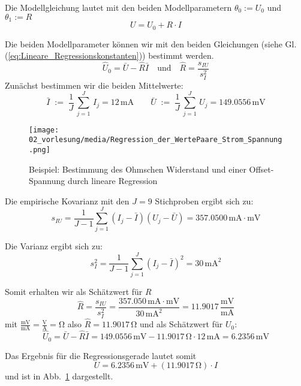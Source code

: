 Die Modellgleichung lautet mit den beiden Modellparametern 
$\theta_0 :=U_0$ und $\theta_1:=R$ 
\begin{equation}
U = U_0 + R \cdot I
\end{equation}

Die beiden Modellparameter können wir mit den beiden Gleichungen (siehe Gl. (\ref{eq:Lineare_Regressionskonstanten})) bestimmt werden.
\begin{equation}
\hat{U}_0 = \bar {U} - \hat{R} \bar {I} \quad \mathrm{und} \quad
\hat{R} = \frac{s_{IU} }{s_I^2 }
\label{eq:Lineare_Regressionskonstanten_Widerstand}
\end{equation}
Zunächst bestimmen wir die beiden Mittelwerte:
\begin{equation}
\bar{I}\; := \; \frac{1}{J} \, \sum\limits_{j = 1}^J \, I_j
= 12 \, \mathrm{mA}
\qquad 
\bar{U} \; := \; \frac{1}{J} \, \sum\limits_{j = 1}^J \, U_j
= 149.0556  \, \mathrm{mV}
\end{equation}
\begin{figure}
	\centering
	\texttt{[image: 02\_vorlesung/media/Regression\_der\_WertePaare\_Strom\_Spannung.png]}
	\caption{Beispiel: Bestimmung des Ohmschen Widerstand und einer Offset-Spannung durch lineare Regression} \label{fig:LineareRegressionWiderstand}
\end{figure}
Die empirische Kovarianz mit den $J = 9$ Stichproben ergibt sich zu: 
\[
s_{IU} = \frac{1}{J - 1}\sum\limits_{j = 1}^J 
(I_j - \bar {I})(U_j - \bar {U}) = 357.0500  \, \mathrm{mA} \cdot \mathrm{mV}
\]

Die Varianz ergibt sich zu: 
\[
s_I^2 = \frac{1}{J - 1}\sum\limits_{j = 1}^J {(I_j - \bar {I})^2} = 30  \, \mathrm{mA}^2
\]

Somit erhalten wir als Schätzwert für $R$
\[
\hat{R} = \frac{s_{IU} }{s_I^2} = \frac{357.050 \, \mathrm{mA} \cdot \mathrm{mV}}{30 \, \mathrm{mA}^2} = 11.9017 
\, \frac{\mathrm{mV}}{\mathrm{mA}}
\]
mit $\frac{\mathrm{mV}}{\mathrm{mA}} = \frac{\mathrm{V}}{\mathrm{A}} = \mathrm{\Omega}$ also $\hat{R} = 11.9017 \, \mathrm{\Omega}$
und als Schätzwert für $U_0$: 
\[
\hat{U}_0 = \bar {U} - \hat{R} \bar {I} = 149.0556 \, \mathrm{mV}-  11.9017  \, \mathrm{\Omega} \cdot 12 \, \mathrm{mA} =
6.2356 \, \mathrm{mV}
\]

Das Ergebnis für die Regressionsgerade lautet somit
\begin{equation}
U = 6.2356  \, \mathrm{mV} + (11.9017 \, \mathrm{\Omega}) \cdot I 
\end{equation}
 und ist in Abb.~\ref*{fig:LineareRegressionWiderstand} dargestellt.

